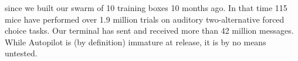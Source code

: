
 since we built our swarm of 10 training boxes 10 months ago. In that time 115 mice have performed over 1.9 million trials on auditory two-alternative forced choice tasks. Our terminal has sent and received more than 42 million messages. While Autopilot is (by definition) immature at release, it is by no means untested.
